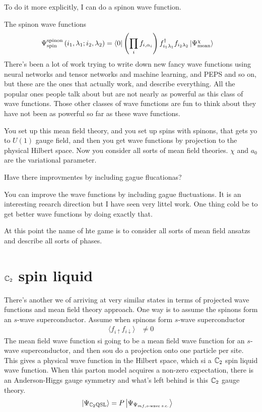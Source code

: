 To do it more explicitly,
I can do a spinon wave function.

The spinon wave functions
\begin{align}
    \Psi_{\mathrm{spin}}^{\mathrm{spinon}}
    \left( i_1, \lambda_1; i_2, \lambda_2 \right)
    &=
    \bra{0}
    \left( 
    \prod_{i} f_{i,\alpha_i}
    \right)
    f_{i_1\lambda_1}^{\dagger}
    f_{i_2 \lambda_2}
    \ket{\Psi_{\mathrm{mean}}^{\chi}}
\end{align}
There's been a lot of work trying to write down new fancy wave functions using
neural networks and tensor networks and machine learning,
and PEPS and so on,
but these are the ones that actually work,
and describe everything.
All the popular ones people talk about but are not nearly as powerful as this
class of wave functions.
Those other classes of wave functions are fun to think about they have not been
as powerful so far as these wave functions.

You set up this mean field theory,
and you set up spins with spinons,
that gets yo to $U(1)$ gauge field,
and then you get wave functions by projection to the physical Hilbert space.
Now you consider all sorts of mean field theories.
$\chi$ and $a_0$ are the variational parameter.

\begin{question}
    Have there improvmentes by including gague flucationas?
\end{question}
You can improve the wave functions by including gague fluctuations.
It is an interesting reearch direction but I have seen very littel work.
One thing cold be to get better wave functions by doing exactly that.

At this point the name of hte game is to consider all sorts of mean field
ansatzs and describe all sorts of phases.

\section{$\mathbb{C}_2$ spin liquid}
There's another we of arriving at very similar states in terms of projected wave
functions and mean field theory approach.
One way is to assume the spinons form an $s$-wave superconductor.
Assume when spinons form $s$-wave superconductor
\begin{align}
    \langle f_{i\uparrow} f_{i\downarrow}\rangle
    &\ne 0
\end{align}
The mean field wave function si going to be a mean field wave function for an
$s$-wave superconductor,
and then sou do a projection onto one particle per site.
This gives a physical wave function in the Hilbert space,
which si a $\mathbb{C}_2$ spin liquid wave function.
When this parton model acquires a non-zero expectation,
there is an Anderson-Higgs gauge symmetry
and what's left behind is this $\mathbb{C}_2$ gauge theory.
\begin{align}
    \ket{\Psi_{\mathbb{C}_2 \mathrm{QSL}}}
    &=
    P
    \ket{\Psi_{\Psi_{mf,s\text{-wave s.c.}}}}
\end{align}

